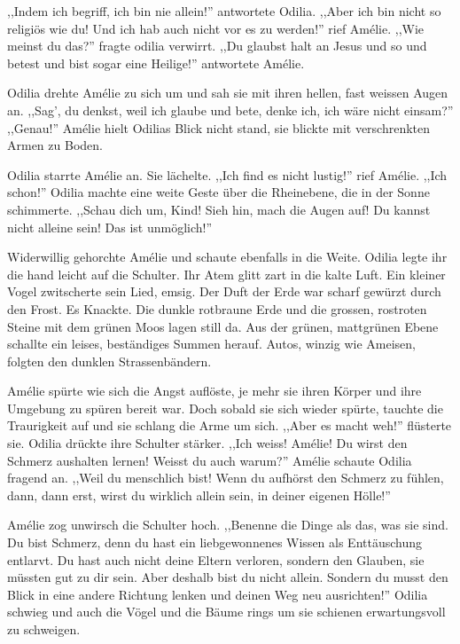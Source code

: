 \documentclass[11pt,titlepage,a5paper]{book}
\begin{document}
,,Indem ich begriff, ich bin nie allein!'' antwortete Odilia. ,,Aber ich bin nicht so religiös wie du! Und ich hab auch nicht vor es zu werden!'' rief Amélie. ,,Wie meinst du das?'' fragte odilia verwirrt. ,,Du glaubst halt an Jesus und so und betest und bist sogar eine Heilige!'' antwortete Amélie.

Odilia drehte Amélie zu sich um und sah sie mit ihren hellen, fast weissen Augen an. ,,Sag', du denkst, weil ich glaube und bete, denke ich, ich wäre nicht einsam?'' ,,Genau!'' Amélie hielt Odilias Blick nicht stand, sie blickte mit verschrenkten Armen zu Boden.

Odilia starrte Amélie an. Sie lächelte. ,,Ich find es nicht lustig!'' rief Amélie. ,,Ich schon!'' Odilia machte eine weite Geste über die Rheinebene, die in der Sonne schimmerte. ,,Schau dich um, Kind! Sieh hin, mach die Augen auf! Du kannst nicht alleine sein! Das ist unmöglich!''

Widerwillig gehorchte Amélie und schaute ebenfalls in die Weite. Odilia legte ihr die hand leicht auf die Schulter. Ihr Atem glitt zart in die kalte Luft. Ein kleiner Vogel zwitscherte sein Lied, emsig. Der Duft der Erde war scharf gewürzt durch den Frost. Es Knackte. Die dunkle rotbraune Erde und die grossen, rostroten Steine mit dem grünen Moos lagen still da. Aus der grünen, mattgrünen Ebene schallte ein leises, beständiges Summen herauf. Autos, winzig wie Ameisen, folgten den dunklen Strassenbändern.

Amélie spürte wie sich die Angst auflöste, je mehr sie ihren Körper und ihre Umgebung zu spüren bereit war. Doch sobald sie sich wieder spürte, tauchte die Traurigkeit auf und sie schlang die Arme um sich. ,,Aber es macht weh!'' flüsterte sie. Odilia drückte ihre Schulter stärker. ,,Ich weiss! Amélie! Du wirst den Schmerz aushalten lernen! Weisst du auch warum?'' Amélie schaute Odilia fragend an. ,,Weil du menschlich bist! Wenn du aufhörst den Schmerz zu fühlen, dann, dann erst, wirst du wirklich allein sein, in deiner eigenen Hölle!''

Amélie zog unwirsch die Schulter hoch. ,,Benenne die Dinge als das, was sie sind. Du bist Schmerz, denn du hast ein liebgewonnenes Wissen als Enttäuschung entlarvt. Du hast auch nicht deine Eltern verloren, sondern den Glauben, sie müssten gut zu dir sein. Aber deshalb bist du nicht allein. Sondern du musst den Blick in eine andere Richtung lenken und deinen Weg neu ausrichten!'' Odilia schwieg und auch die Vögel und die Bäume rings um sie schienen erwartungsvoll zu schweigen.
\end{document}
